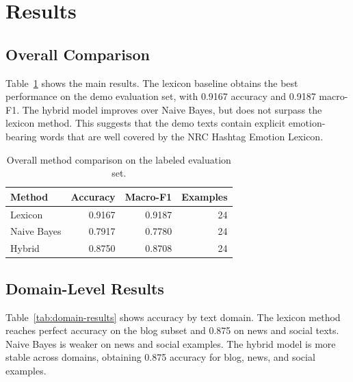 \section{Results}

\subsection{Overall Comparison}

Table~\ref{tab:main-results} shows the main results. The lexicon baseline obtains the best performance on the demo evaluation set, with 0.9167 accuracy and 0.9187 macro-F1. The hybrid model improves over Naive Bayes, but does not surpass the lexicon method. This suggests that the demo texts contain explicit emotion-bearing words that are well covered by the NRC Hashtag Emotion Lexicon.

\begin{table}[h]
\centering
\small
\begin{tabular}{lrrr}
\toprule
\textbf{Method} & \textbf{Accuracy} & \textbf{Macro-F1} & \textbf{Examples} \\
\midrule
Lexicon & 0.9167 & 0.9187 & 24 \\
Naive Bayes & 0.7917 & 0.7780 & 24 \\
Hybrid & 0.8750 & 0.8708 & 24 \\
\bottomrule
\end{tabular}
\caption{Overall method comparison on the labeled evaluation set.}
\label{tab:main-results}
\end{table}

\subsection{Domain-Level Results}

Table~\ref{tab:domain-results} shows accuracy by text domain. The lexicon method reaches perfect accuracy on the blog subset and 0.875 on news and social texts. Naive Bayes is weaker on news and social examples. The hybrid model is more stable across domains, obtaining 0.875 accuracy for blog, news, and social examples.

